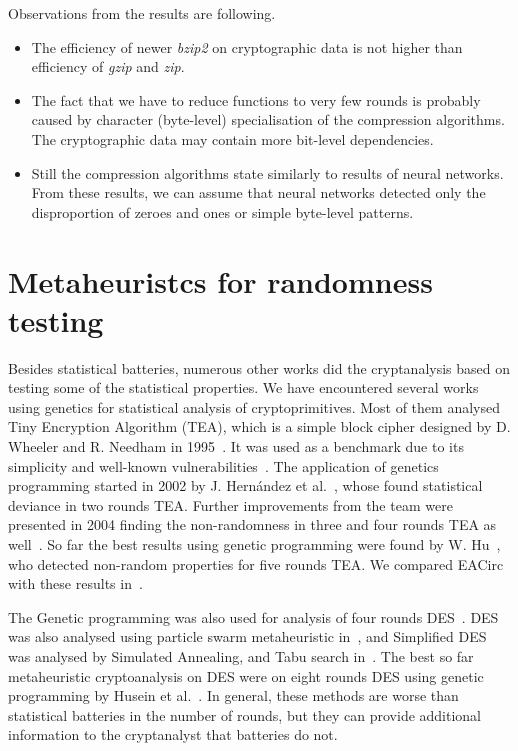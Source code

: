 \documentclass[
  print, %
  Table,   %
  nolof,     %
  nolot,     %
  11pt, %
  oneside  %
]{fithesis3}
\begin{document}
Observations from the results are following.

\begin{itemize}
    \item The efficiency of newer \textit{bzip2} on cryptographic data is not higher than efficiency of \textit{gzip} and \textit{zip}.
    \item The fact that we have to reduce functions to very few rounds is probably caused by character (byte-level) specialisation of the compression algorithms. The cryptographic data may contain more bit-level dependencies.
    \item Still the compression algorithms state similarly to results of neural networks. From these results, we can assume that neural networks detected only the disproportion of zeroes and ones or simple byte-level patterns.
\end{itemize}


\section{Metaheuristcs for randomness testing}
\label{sec:relatwork-paper}

Besides statistical batteries, numerous other works did the cryptanalysis based on testing some of the statistical properties. We have encountered several works using genetics for statistical analysis of cryptoprimitives. Most of them analysed Tiny Encryption Algorithm (TEA), which is a simple block cipher designed by D. Wheeler and R. Needham in 1995~\cite{TEA}. It was used as a benchmark due to its simplicity and well-known vulnerabilities~\cite{TEAAttack}. The application of genetics programming started in 2002 by J. Hernández et al.~\cite{twoRoundsTea}, whose found statistical deviance in two rounds TEA. Further improvements from the team were presented in 2004 finding the non-randomness in three and four rounds TEA as well~\cite{fourRoundsTea}. So far the best results using genetic programming were found by W. Hu~\cite{fiveRoundsTea}, who detected non-random properties for five rounds TEA. We compared EACirc with these results in~\cite{2016-infocommunications-kubicek}.

The Genetic programming was also used for analysis of four rounds DES~\cite{song2007cryptanalysis}. DES was also analysed using particle swarm metaheuristic in~\cite{shahzad2009cryptanalysis}, and Simplified DES was analysed by Simulated Annealing, and Tabu search in~\cite{nalini2005cryptanalysis}. The best so far metaheuristic cryptoanalysis on DES were on eight rounds DES using genetic programming by Husein et al.~\cite{husein2007genetic}. In general, these methods are worse than statistical batteries in the number of rounds, but they can provide additional information to the cryptanalyst that batteries do not.
\end{document}

